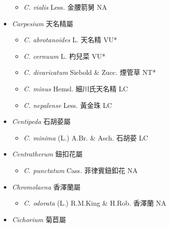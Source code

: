 \begin{itemize}
  \begin{itemize}
        \item[] \textit{C. vialis} Less.  金腰箭舅   NA
  \end{itemize}
 \item[] \textit{Carpesium} 天名精屬
                                
  \begin{itemize}
        \item[] \textit{C. abrotanoides} L.  天名精   VU*
        \item[] \textit{C. cernuum} L.  杓兒菜   VU*
        \item[] \textit{C. divaricatum} Siebold \& Zucc.  煙管草   NT*
        \item[] \textit{C. minus} Hemsl.  細川氏天名精   LC
        \item[] \textit{C. nepalense} Less.  黃金珠   LC
  \end{itemize}
 \item[] \textit{Centipeda} 石胡荽屬
                                
  \begin{itemize}
        \item[] \textit{C. minima} (L.) A.Br. \& Asch.  石胡荽   LC
  \end{itemize}
 \item[] \textit{Centratherum} 鈕扣花屬
                                
  \begin{itemize}
        \item[] \textit{C. punctatum} Cass.  菲律賓鈕釦花   NA
  \end{itemize}
 \item[] \textit{Chromolaena} 香澤蘭屬
                                
  \begin{itemize}
        \item[] \textit{C. odorata} (L.) R.M.King \& H.Rob.  香澤蘭   NA
  \end{itemize}
 \item[] \textit{Cichorium} 菊苣屬
                                

\end{itemize}
